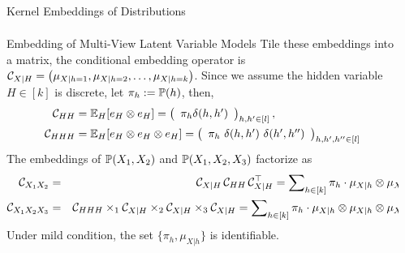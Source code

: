 \documentclass[final,t]{beamer}
\begin{document}
\begin{frame}{}
\begin{columns}[T]
\begin{column}{.3\linewidth}
\begin{block}{Kernel Embeddings of Distributions}
\begin{eqnarray*}
        \end{eqnarray*}
      \end{block}
      \vspace{-0.5in}
      \begin{block}{Embedding of Multi-View Latent Variable Models}
      Tile these embeddings into a matrix, the conditional embedding operator is
      $
        \mathcal{C}_{X|H} = \left(\mu_{X|h=1},\mu_{X|h=2},\ldots,\mu_{X|h=k}\right)
      $. Since we assume the hidden variable $H \in [k]$ is discrete, let $\pi_h:=\mathbb{P}(h)$, then,
         \begin{align*}
         \mathcal{C}_{HH} &= \mathbb{E}_H[e_H \otimes e_H] = \left(
          \begin{array}{c}
            \pi_h \delta(h, h') \cr
          \end{array}
         \right)_{h,h' \in [l]},\\
         \mathcal{C}_{HHH} &= \mathbb{E}_H[e_H \otimes e_H \otimes e_H] 
          = \left(
          \begin{array}{c}
            \pi_h\ \delta(h,h')\ \delta(h',h'') \cr
          \end{array}
         \right)_{h,h',h''\in[l]}
        \end{align*}
      The embeddings of $\mathbb{P}(X_1,X_2)$ and $\mathbb{P}(X_1,X_2,X_3)$ factorize as
      \begin{eqnarray*}
        \mathcal{C}_{X_1X_2}&=& \mathcal{C}_{X|H}\, \mathcal{C}_{HH}\, \mathcal{C}_{X|H}^\top=\sum\nolimits_{h \in [k]} \pi_h\cdot \mu_{X|h} \otimes \mu_{X|h}\\
        \mathcal{C}_{X_1 X_2 X_3} &=& \mathcal{C}_{HHH} \times_1 \mathcal{C}_{X|H} \times_2 \mathcal{C}_{X|H} \times_3 \mathcal{C}_{X|H}
        =\sum\nolimits_{h \in [k]} \pi_h\cdot \mu_{X|h} \otimes \mu_{X|h} \otimes \mu_{X|h}
      \end{eqnarray*}
      Under mild condition, the set $\{\pi_h, \mu_{X|h}\}$ is \alert{identifiable}.
      \end{block}

      \vspace{-0.5in}
    \end{column}


    \begin{column}{.3\linewidth}



\end{column}
\end{columns}
\end{frame}
\end{document}
